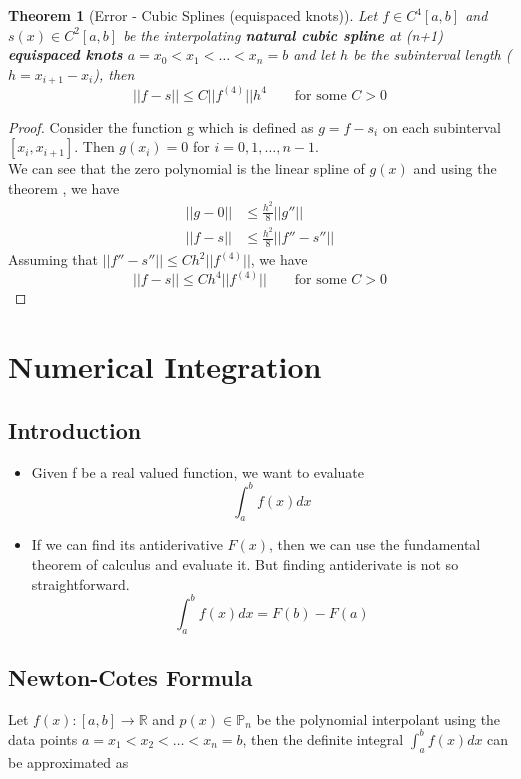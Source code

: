 \documentclass{article}
\newtheorem*{theorem}{Theorem}
\begin{document}
	\begin{theorem}[Error - Cubic Splines (equispaced knots)]
		Let $f\in C^4[a,b]$ and $s(x) \in C^2[a,b]$ be the interpolating \textbf{natural cubic spline} at (n+1) \textbf{equispaced knots} $a=x_0<x_1<\hdots<x_n=b$ and let $h$ be the subinterval length ($h=x_{i+1}-x_i$), then
			\[\boxed{||f-s|| \leq C||f^{(4)}|| h^4 \qquad \text{for some } C>0 }\] 
	\end{theorem}
	\begin{proof}
		Consider the function g which is defined as $g=f-s_i$ on each subinterval $[x_i,x_{i+1}]$.
		Then $g(x_i)=0$ for $i=0,1,\hdots,n-1$.\\
		We can see that the zero polynomial is the linear spline of $g(x)$ and using the theorem , we have
		\begin{align*}
			||g-0|| &\leq \frac{h^2}{8} ||g''||\\
            ||f-s|| &\leq \frac{h^2}{8} ||f'' - s''||
		\end{align*}
		Assuming that $||f''-s''||\leq C h^2 ||f^{(4)}||$, we have
		\[||f-s|| \leq C h^4 ||f^{(4)}|| \qquad \text{for some } C> 0\]
		
	\end{proof}


\section{Numerical Integration}
	\subsection{Introduction}
		\begin{itemize}
			\item Given f be a real valued function, we want to evaluate 
			\[\int_a^b f(x) dx\]

			\item If we can find its antiderivative $F(x)$, then we can use the fundamental theorem of calculus and evaluate it. But finding antiderivate is not so straightforward.
			\[\int_a^b f(x) dx = F(b) - F(a)\]
		\end{itemize}

	\subsection{Newton-Cotes Formula}
		Let $f(x):[a,b]\rightarrow \mathbb{R}$ and $p(x) \in \mathbb{P}_n$ be the polynomial interpolant using the data points $a=x_1<x_2<\hdots<x_n=b$, then the definite integral $\int_a^b f(x) dx$ can be approximated as 
\end{document}

